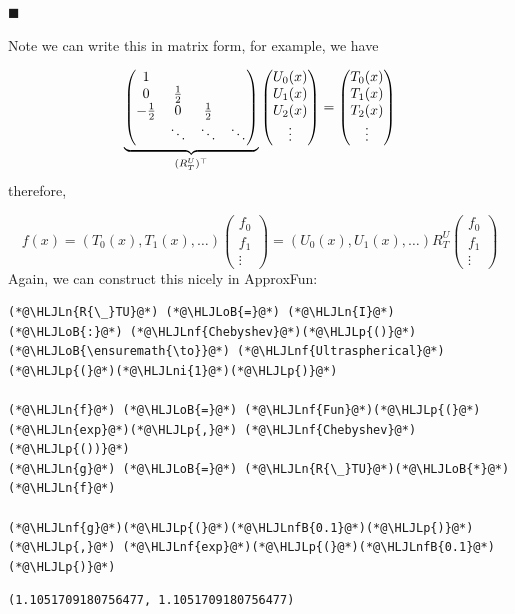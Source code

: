 \documentclass[12pt,a4paper]{article}
\newcommand{\HLJLn}[1]{#1}
\newcommand{\HLJLnf}[1]{\textcolor[RGB]{66,102,213}{#1}}
\newcommand{\HLJLnfB}[1]{\textcolor[RGB]{59,151,46}{#1}}
\newcommand{\HLJLni}[1]{\textcolor[RGB]{59,151,46}{#1}}
\newcommand{\HLJLoB}[1]{\textcolor[RGB]{102,102,102}{\textbf{#1}}}
\newcommand{\HLJLp}[1]{#1}
\def\half{ {1 \over 2} }
\begin{document}
\ensuremath{\blacksquare}

Note we can write this in matrix form, for example, we have

\[
\underbrace{\begin{pmatrix}1 \cr
                    0 & \half\cr
                       -\half & 0 & \half \cr
                           &\ddots &\ddots & \ddots\end{pmatrix} }_{(R_T^U)^\top} \begin{pmatrix} 
                           U_0(x) \\ U_1(x) \\ U_2(x) \\ \vdots \end{pmatrix}  =  \begin{pmatrix} T_0(x) \\ T_1(x) \\ T_2(x) \\ \vdots \end{pmatrix}
\]
therefore,

\[
f(x) =  (T_0(x),T_1(x),\ldots) \begin{pmatrix} f_0\\f_1\\\vdots \end{pmatrix} =  (U_0(x),U_1(x),\ldots) R_T^U \begin{pmatrix} f_0\\f_1\\\vdots \end{pmatrix}
\]
Again, we can construct this nicely in ApproxFun:


\begin{lstlisting}
(*@\HLJLn{R{\_}TU}@*) (*@\HLJLoB{=}@*) (*@\HLJLn{I}@*) (*@\HLJLoB{:}@*) (*@\HLJLnf{Chebyshev}@*)(*@\HLJLp{()}@*) (*@\HLJLoB{\ensuremath{\to}}@*) (*@\HLJLnf{Ultraspherical}@*)(*@\HLJLp{(}@*)(*@\HLJLni{1}@*)(*@\HLJLp{)}@*)

(*@\HLJLn{f}@*) (*@\HLJLoB{=}@*) (*@\HLJLnf{Fun}@*)(*@\HLJLp{(}@*)(*@\HLJLn{exp}@*)(*@\HLJLp{,}@*) (*@\HLJLnf{Chebyshev}@*)(*@\HLJLp{())}@*)
(*@\HLJLn{g}@*) (*@\HLJLoB{=}@*) (*@\HLJLn{R{\_}TU}@*)(*@\HLJLoB{*}@*)(*@\HLJLn{f}@*)

(*@\HLJLnf{g}@*)(*@\HLJLp{(}@*)(*@\HLJLnfB{0.1}@*)(*@\HLJLp{)}@*) (*@\HLJLp{,}@*) (*@\HLJLnf{exp}@*)(*@\HLJLp{(}@*)(*@\HLJLnfB{0.1}@*)(*@\HLJLp{)}@*)
\end{lstlisting}

\begin{lstlisting}
(1.1051709180756477, 1.1051709180756477)
\end{lstlisting}
\end{document}
